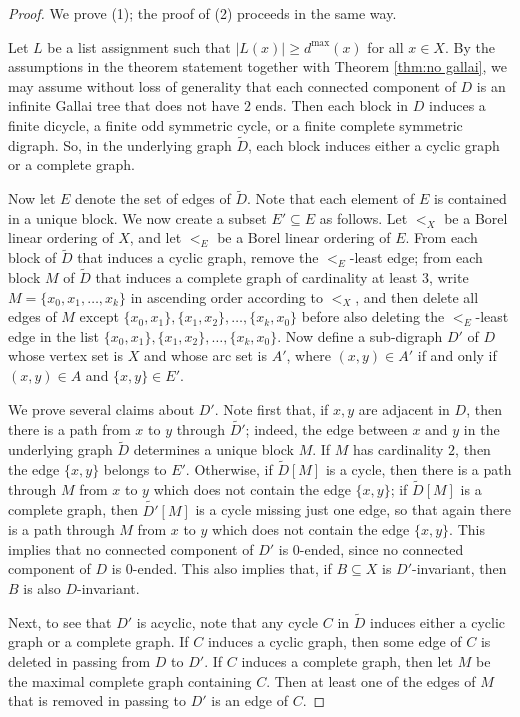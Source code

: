 \documentclass[psamsfonts]{amsart}
\theoremstyle{definition}
\theoremstyle{remark}
\numberwithin{equation}{section}
\begin{document}
\begin{proof}
    We prove (1); the proof of (2) proceeds in the same way.

    Let $L$ be a list assignment such that $\vert L(x) \vert \geq d^{\max}(x)$ for all $x \in X$. By the assumptions in the theorem statement together with Theorem \ref{thm:no gallai}, we may assume without loss of generality that each connected component of $D$ is an infinite Gallai tree that does not have $2$ ends. Then each block in $D$ induces a finite dicycle, a finite odd symmetric cycle, or a finite complete symmetric digraph. So, in the underlying graph $\tilde{D}$, each block induces either a cyclic graph or a complete graph.

    Now let $E$ denote the set of edges of $\tilde{D}$. Note that each element of $E$ is contained in a unique block. We now create a subset $E' \subseteq E$ as follows. Let $<_X$ be a Borel linear ordering of $X$, and let $<_E$ be a Borel linear ordering of $E$. From each block of $\tilde{D}$ that induces a cyclic graph, remove the $<_E$-least edge; from each block $M$ of $\tilde{D}$ that induces a complete graph of cardinality at least $3$, write $M = \{x_0, x_1, \dots, x_k\}$ in ascending order according to $<_X$, and then delete all edges of $M$ except $\{x_0, x_1\}, \{x_1, x_2\}, \dots, \{x_k, x_0\}$ before also deleting the $<_E$-least edge in the list $\{x_0, x_1\}, \{x_1, x_2\}, \dots, \{x_k, x_0\}$. Now define a sub-digraph $D'$ of $D$ whose vertex set is $X$ and whose arc set is $A'$, where $(x, y) \in A'$ if and only if $(x, y) \in A$ and $\{x, y\} \in E'$.

    We prove several claims about $D'$. Note first that, if $x, y$ are adjacent in $D$, then there is a path from $x$ to $y$ through $\widetilde{D'}$; indeed, the edge between $x$ and $y$ in the underlying graph $\tilde{D}$ determines a unique block $M$. If $M$ has cardinality $2$, then the edge $\{x, y\}$ belongs to $E'$. Otherwise, if $\tilde{D}[M]$ is a cycle, then there is a path through $M$ from $x$ to $y$ which does not contain the edge $\{x, y\}$; if $\tilde{D}[M]$ is a complete graph, then $\widetilde{D'}[M]$ is a cycle missing just one edge, so that again there is a path through $M$ from $x$ to $y$ which does not contain the edge $\{x, y\}$. This implies that no connected component of $D'$ is $0$-ended, since no connected component of $D$ is $0$-ended. This also implies that, if $B \subseteq X$ is $D'$-invariant, then $B$ is also $D$-invariant.

    Next, to see that $D'$ is acyclic, note that any cycle $C$ in $\tilde{D}$ induces either a cyclic graph or a complete graph. If $C$ induces a cyclic graph, then some edge of $C$ is deleted in passing from $D$ to $D'$. If $C$ induces a complete graph, then let $M$ be the maximal complete graph containing $C$. Then at least one of the edges of $M$ that is removed in passing to $D'$ is an edge of $C$.


\end{proof}
\end{document}
